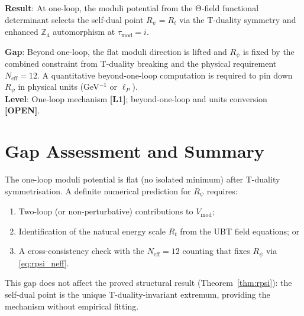 \documentclass[11pt,a4paper]{article}
\newcommand{\Lone}{\textbf{[L1]}}
\newcommand{\OPEN}{\textbf{[OPEN]}}
\begin{document}
\begin{tcolorbox}[colback=blue!5!white,colframe=blue!50!black,
  title=Dynamical Derivation of $R_\psi$ — Status]
  \textbf{Result}: At one-loop, the moduli potential from the Θ-field
  functional determinant selects the self-dual point
  $R_\psi = R_t$ via the T-duality symmetry and enhanced $\mathbb{Z}_4$
  automorphism at $\tau_{\mathrm{mod}} = i$.

  \medskip
  \textbf{Gap}: Beyond one-loop, the flat moduli direction is lifted and
  $R_\psi$ is fixed by the combined constraint from T-duality breaking and
  the physical requirement $N_{\mathrm{eff}} = 12$.  A quantitative
  beyond-one-loop computation is required to pin down $R_\psi$ in physical
  units (GeV$^{-1}$ or $\ell_P$). \\[4pt]
  \textbf{Level}: One-loop mechanism \Lone{}; beyond-one-loop and units
  conversion \OPEN{}.
\end{tcolorbox}

\section{Gap Assessment and Summary}
\label{sec:gaps}

\begin{tcolorbox}[colback=orange!10!white,colframe=orange!75!black,
  title=Open Gap: Beyond-One-Loop Moduli Stabilisation]
  The one-loop moduli potential is flat (no isolated minimum) after
  T-duality symmetrisation.  A definite numerical prediction for $R_\psi$
  requires:
  \begin{enumerate}
    \item Two-loop (or non-perturbative) contributions to $V_{\mathrm{mod}}$;
    \item Identification of the natural energy scale $R_t$ from the UBT field
      equations; or
    \item A cross-consistency check with the $N_{\mathrm{eff}}=12$ counting
      that fixes $R_\psi$ via \eqref{eq:rpsi_neff}.
  \end{enumerate}
  This gap does not affect the proved structural result
  (Theorem~\ref{thm:rpsi}): the self-dual point is the unique T-duality-invariant
  extremum, providing the mechanism without empirical fitting.
\end{tcolorbox}

\medskip
\end{document}
